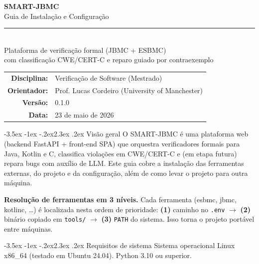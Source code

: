 \documentclass[11pt,a4paper]{article}
\makeatletter
\renewcommand\section{\@startsection{section}{1}{0pt}%
  {-3.5ex \@plus -1ex \@minus -.2ex}{2.3ex \@plus.2ex}%
  {\normalfont\Large\bfseries\color{azulesc}}}
\newcommand{\nota}[1]{%
  \begin{center}\colorbox{verdebg}{\parbox{0.95\linewidth}{%
  \color{verdebox}#1}}\end{center}}
\makeatother
\begin{document}
\begin{titlepage}
\vspace*{3cm}
\begin{center}
{\color{azulesc}\Huge\bfseries SMART-JBMC}\\[10pt]
{\color{azulmed}\LARGE Guia de Instala\c{c}\~ao e Configura\c{c}\~ao}\\[40pt]
\rule{0.7\linewidth}{2pt}\\[20pt]
{\large Plataforma de verifica\c{c}\~ao formal (JBMC + ESBMC)}\\[6pt]
{\large com classifica\c{c}\~ao CWE/CERT-C e reparo guiado por contraexemplo}\\[40pt]
\begin{tabular}{rl}
\textbf{Disciplina:} & Verifica\c{c}\~ao de Software (Mestrado)\\[4pt]
\textbf{Orientador:} & Prof. Lucas Cordeiro (University of Manchester)\\[4pt]
\textbf{Vers\~ao:} & 0.1.0\\[4pt]
\textbf{Data:} & 23 de maio de 2026\\
\end{tabular}
\end{center}
\vfill
\end{titlepage}

\tableofcontents
\newpage

\section{Vis\~ao geral}
O SMART-JBMC \'e uma plataforma web (backend FastAPI + front-end SPA) que orquestra
verificadores formais para Java, Kotlin e C, classifica viola\c{c}\~oes em CWE/CERT-C
e (em etapa futura) repara bugs com aux\'ilio de LLM. Este guia cobre a instala\c{c}\~ao
das ferramentas externas, do projeto e da configura\c{c}\~ao, al\'em de como levar o
projeto para outra m\'aquina.

\nota{\textbf{Resolu\c{c}\~ao de ferramentas em 3 n\'iveis.} Cada ferramenta (esbmc, jbmc,
kotlinc, \dots) \'e localizada nesta ordem de prioridade: \textbf{(1)} caminho no
\texttt{.env} \(\to\) \textbf{(2)} bin\'ario copiado em \texttt{tools/} \(\to\)
\textbf{(3)} \texttt{PATH} do sistema. Isso torna o projeto port\'avel entre m\'aquinas.}

\section{Requisitos de sistema}
Sistema operacional Linux x86\_64 (testado em Ubuntu 24.04). Python 3.10 ou superior.
\end{document}
